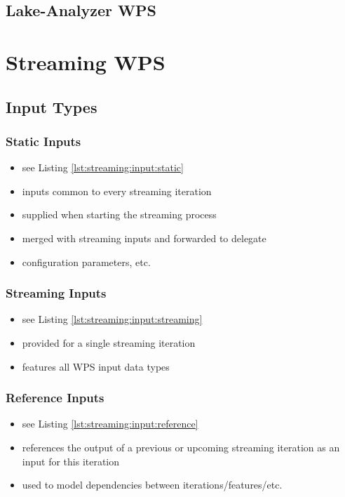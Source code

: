 	\subsection{Lake-Analyzer WPS}
\section{Streaming WPS}
	\subsection{Input Types}\label{sec:streaming:input-types}
	\subsubsection{Static Inputs}
		\begin{itemize}
			\item see Listing \ref{lst:streaming:input:static}
			\item inputs common to every streaming iteration
			\item supplied when starting the streaming process
			\item merged with streaming inputs and forwarded to delegate
			\item configuration parameters, etc.
		\end{itemize}
	\subsubsection{Streaming Inputs}
		\begin{itemize}
			\item see Listing \ref{lst:streaming:input:streaming}
			\item provided for a single streaming iteration
			\item features all WPS input data types
		\end{itemize}
	\subsubsection{Reference Inputs}
		\begin{itemize}
			\item see Listing \ref{lst:streaming:input:reference}
			\item references the output of a previous or upcoming streaming iteration as an input for this iteration
			\item used to model dependencies between iterations/features/etc.
		\end{itemize}

